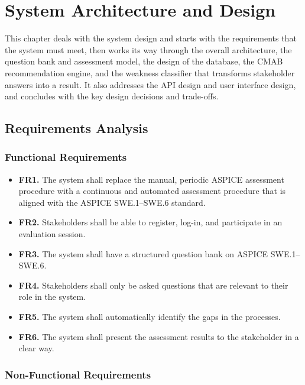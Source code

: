 \documentclass[a4paper, 12pt, oneside, openany, BCOR1cm,toc=chapterentrywithdots]{scrbook}
\begin{document}
\chapter{System Architecture and Design}
\label{chap:architecture}
% 

This chapter deals with the system design and starts with the requirements that the system must
meet, then works its way through the overall architecture, the question bank and assessment
model, the design of the database, the CMAB recommendation engine, and the weakness classifier
that transforms stakeholder answers into a result. It also addresses the API design and user
interface design, and concludes with the key design decisions and trade-offs.

\section{Requirements Analysis}
\label{sec:requirements-analysis}

\subsection{Functional Requirements}

\begin{itemize}
  \item \textbf{FR1.} The system shall replace the manual, periodic ASPICE assessment procedure
  with a continuous and automated assessment procedure that is aligned with the ASPICE
  SWE.1--SWE.6 standard.
  \item \textbf{FR2.} Stakeholders shall be able to register, log-in, and participate in an
  evaluation session.
  \item \textbf{FR3.} The system shall have a structured question bank on ASPICE SWE.1--SWE.6.
  \item \textbf{FR4.} Stakeholders shall only be asked questions that are relevant to their role
  in the system.
  \item \textbf{FR5.} The system shall automatically identify the gaps in the processes.
  \item \textbf{FR6.} The system shall present the assessment results to the stakeholder in a
  clear way.
\end{itemize}

\subsection{Non-Functional Requirements}
\end{document}
